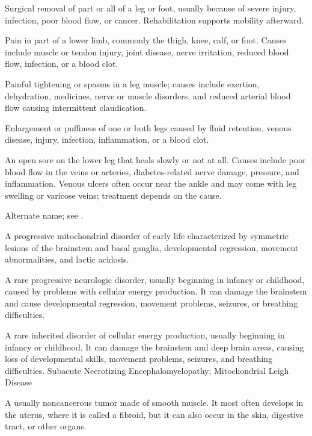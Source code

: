  Surgical removal of part or all of a leg or foot, usually because of severe injury, infection, poor blood flow, or cancer. Rehabilitation supports mobility afterward.

 Pain in part of a lower limb, commonly the thigh, knee, calf, or foot. Causes include muscle or tendon injury, joint disease, nerve irritation, reduced blood flow, infection, or a blood clot.

 Painful tightening or spasms in a leg muscle; causes include exertion, dehydration, medicines, nerve or muscle disorders, and reduced arterial blood flow causing intermittent claudication.

 Enlargement or puffiness of one or both legs caused by fluid retention, venous disease, injury, infection, inflammation, or a blood clot.

 An open sore on the lower leg that heals slowly or not at all. Causes include poor blood flow in the veins or arteries, diabetes-related nerve damage, pressure, and inflammation. Venous ulcers often occur near the ankle and may come with leg swelling or varicose veins; treatment depends on the cause.

 Alternate name; see .

 A progressive mitochondrial disorder of early life characterized by symmetric lesions of the brainstem and basal ganglia, developmental regression, movement abnormalities, and lactic acidosis.

 A rare progressive neurologic disorder, usually beginning in infancy or childhood, caused by problems with cellular energy production. It can damage the brainstem and cause developmental regression, movement problems, seizures, or breathing difficulties.

 A rare inherited disorder of cellular energy production, usually beginning in infancy or childhood. It can damage the brainstem and deep brain areas, causing loss of developmental skills, movement problems, seizures, and breathing difficulties.
\synonyms
Subacute Necrotizing Encephalomyelopathy; Mitochondrial Leigh Disease

 A usually noncancerous tumor made of smooth muscle. It most often develops in the uterus, where it is called a fibroid, but it can also occur in the skin, digestive tract, or other organs.

